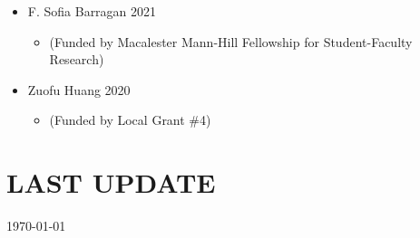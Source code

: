 \documentclass[margin]{res}
\begin{document}
\begin{resume}
\begin{itemize}
\item F. Sofia Barragan \hfill 2021 
	\begin{itemize}[leftmargin=-0in] \vspace{-0.2cm}
	\item[]\begin{footnotesize}(Funded by Macalester Mann-Hill Fellowship for Student-Faculty Research) \end{footnotesize}
	\end{itemize}

\item Zuofu Huang \hfill 2020 
	\begin{itemize}[leftmargin=-0in] \vspace{-0.2cm}
	\item[]\begin{footnotesize}(Funded by Local Grant \#4) \end{footnotesize}
	\end{itemize}
\end{itemize}

	

	
		


			
\section{LAST UPDATE} \today

\end{resume}
\end{document}
